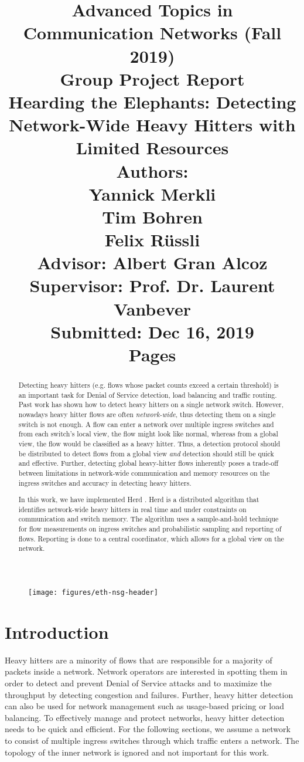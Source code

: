 \documentclass[11pt,oneside,a4paper]{article}
\title{
    \vspace*{0.0mm}
    \LARGE\bf\sf Advanced Topics in \\Communication Networks (Fall 2019)
    \vspace*{10.0mm} \\
    \Large\bf\sf Group Project Report \vspace*{30.0mm}\\
    \Huge\bf\sf Hearding the Elephants: Detecting Network-Wide Heavy Hitters with Limited Resources
    \vspace*{30.0mm} \\
    \normalsize
    \sf Authors:\\[5pt]
    \sf Yannick Merkli\\ [5pt]
    \sf Tim Bohren\\ [5pt]
    \sf Felix Rüssli \vspace*{5mm}\\
    \sf  Advisor: Albert Gran Alcoz \vspace*{5mm}\\
    \sf  Supervisor:  Prof. Dr. Laurent Vanbever \vspace*{20.0mm}\\
    \sf Submitted: Dec 16, 2019\\ [5pt]
    \sf \pageref{lastpage} Pages
}
\date{}
\begin{document}
\begin{figure}
    \texttt{[image: figures/eth-nsg-header]}
\end{figure}

\maketitle
\thispagestyle{empty}
\raggedbottom
\clearpage


\begin{abstract}
\noindent Detecting heavy hitters (e.g. flows whose packet counts exceed a certain threshold) is an important task for Denial of Service detection, load balancing and traffic routing. Past work has shown how to detect heavy hitters on a single network switch. However, nowadays heavy hitter flows are often \textit{network-wide}, thus detecting them on a single switch is not enough. A flow can enter a network over multiple ingress switches and from each switch's local view, the flow might look like normal, whereas from a global view, the flow would be classified as a heavy hitter. Thus, a detection protocol should be distributed to detect flows from a global view \textit{and} detection should still be quick and effective. Further, detecting global heavy-hitter flows inherently poses a trade-off between limitations in network-wide communication and memory resources on the ingress switches and accuracy in detecting heavy hitters.

In this work, we have implemented Herd \cite{anon2019herd}. Herd is a distributed algorithm that identifies network-wide heavy hitters in real time and under constraints on communication and switch memory. The algorithm uses a sample-and-hold technique for flow measurements on ingress switches and probabilistic sampling and reporting of flows. Reporting is done to a central coordinator, which allows for a global view on the network.

\end{abstract}

\clearpage
\setcounter{tocdepth}{2}
\tableofcontents
\clearpage
{}

\section{Introduction}

Heavy hitters are a minority of flows that are responsible for a majority of packets inside a network. Network operators are interested in spotting them in order to detect and prevent Denial of Service attacks and to maximize the throughput by detecting congestion and failures. Further, heavy hitter detection can also be used for network management such as usage-based pricing or load balancing. To effectively manage and protect networks, heavy hitter detection needs to be quick and efficient. For the following sections, we assume a network to consist of multiple ingress switches through which traffic enters a network. The topology of the inner network is ignored and not important for this work.
\end{document}
